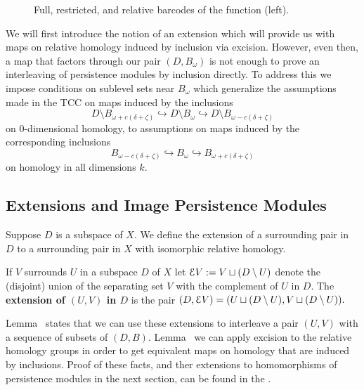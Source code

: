 \begin{figure}[htbp]
\begin{minipage}[b]{0.7\textwidth}
  \end{minipage}
  \caption{Full, restricted, and relative barcodes of the function (left).}%
\end{figure}

We will first introduce the notion of an extension which will provide us with maps on relative homology induced by inclusion via excision.
However, even then, a map that factors through our pair $(D, B_\omega)$ is not enough to prove an interleaving of persistence modules by inclusion directly.
To address this we impose conditions on sublevel sets near $B_\omega$ which generalize the assumptions made in the TCC on maps induced by the inclusions
\[ D\setminus B_{\omega+c(\delta+\zeta)}\hookrightarrow D\setminus B_\omega\hookrightarrow D\setminus B_{\omega-c(\delta+\zeta)}\]
on $0$-dimensional homology, to assumptions on maps induced by the corresponding inclusions
\[ B_{\omega-c(\delta+\zeta)}\hookrightarrow B_\omega\hookrightarrow B_{\omega+c(\delta+\zeta)}\]
on homology in all dimensions $k$.

\subsection{Extensions and Image Persistence Modules}

Suppose $D$ is a subspace of $X$.
We define the extension of a surrounding pair in $D$ to a surrounding pair in $X$ with isomorphic relative homology.

\begin{definition}[Extension]
  If $V$ surrounds $U$ in a subspace $D$ of $X$ let $\mathcal{E} V := V\sqcup (D\setminus U)$ denote the (disjoint) union of the separating set $V$ with the complement of $U$ in $D$.
  The \textbf{extension of $(U, V)$ in $D$} is the pair $(D, \mathcal{E} V) = (U\sqcup (D\setminus U), V\sqcup (D\setminus U)).$
\end{definition}

Lemma~\label{lem:surround_and_cover} states that we can use these extensions to interleave a pair $(U, V)$ with a sequence of subsets of $(D, B)$.
Lemma~\label{excision} we can apply excision to the relative homology groups in order to get equivalent maps on homology that are induced by inclusions.
Proof of these facts, and ther extensions to homomorphisms of persistence modules in the next section, can be found in the \fullversion.

